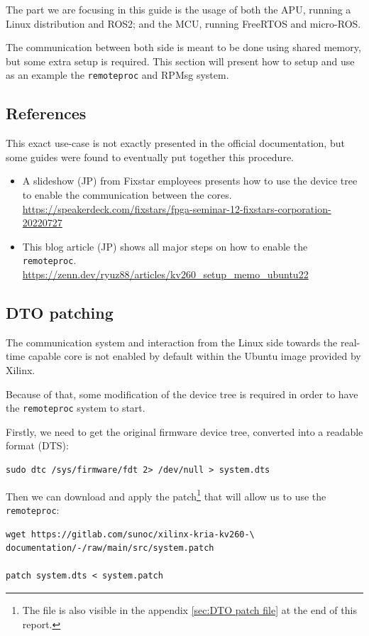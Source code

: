 \documentclass[10pt]{article}
\begin{document}
The part we are focusing in this guide is the usage of both the APU, running
a Linux distribution and ROS2; and the MCU, running FreeRTOS and micro-ROS.

The communication between both side is meant to be done using shared memory, but
some extra setup is required.
This section will present how to setup and use as an example the
\verb|remoteproc| and RPMsg system.

\subsection{References}
This exact use-case is not exactly presented in the official documentation,
but some guides were found to eventually put together this procedure.

\begin{itemize}
\item A slideshow (JP) from Fixstar employees presents how to use the device
  tree to enable the communication between the cores. \\
  \url{https://speakerdeck.com/fixstars/fpga-seminar-12-fixstars-corporation-20220727}
\item This blog article (JP) shows all major steps on how to enable the \verb|remoteproc|. \\
  \url{https://zenn.dev/ryuz88/articles/kv260_setup_memo_ubuntu22}
\end{itemize}


\subsection{DTO patching}
The communication system and interaction from the Linux side towards the real-time capable core
is not enabled by default within the Ubuntu image provided by Xilinx.

Because of that, some modification of the device tree is required in order to have
the \verb|remoteproc| system to start.

Firstly, we need to get the original firmware device tree, converted
into a readable format (DTS):
\begin{tcolorbox}
\begin{verbatim}
sudo dtc /sys/firmware/fdt 2> /dev/null > system.dts
\end{verbatim}
\end{tcolorbox}

Then we can download and apply the patch\footnote{The file is also visible in the appendix \ref{sec:DTO patch file} at the end of this report.} that will allow us to use the \verb|remoteproc|:
\begin{tcolorbox}
\begin{verbatim}
wget https://gitlab.com/sunoc/xilinx-kria-kv260-\
documentation/-/raw/main/src/system.patch

patch system.dts < system.patch
\end{verbatim}
\end{tcolorbox}
\end{document}
